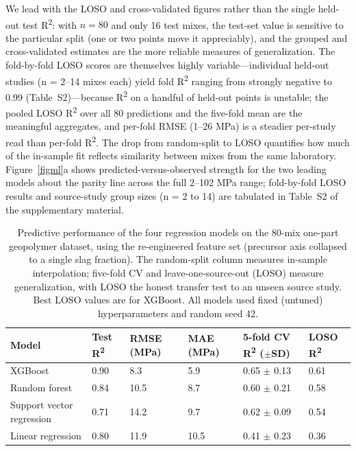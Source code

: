 \documentclass[materials,article,submit,pdftex,moreauthors]{Definitions/mdpi}
\begin{document}
We lead with the LOSO and cross-validated figures rather than the single held-out test R\textsuperscript{2}: with $n = 80$ and only 16 test mixes, the test-set value is sensitive to the particular split (one or two points move it appreciably), and the grouped and cross-validated estimates are the more reliable measures of generalization. The fold-by-fold LOSO scores are themselves highly variable---individual held-out studies (n = 2--14 mixes each) yield fold R\textsuperscript{2} ranging from strongly negative to 0.99 (Table~S2)---because R\textsuperscript{2} on a handful of held-out points is unstable; the pooled LOSO R\textsuperscript{2} over all 80 predictions and the five-fold mean are the meaningful aggregates, and per-fold RMSE (1--26 MPa) is a steadier per-study read than per-fold R\textsuperscript{2}. The drop from random-split to LOSO quantifies how much of the in-sample fit reflects similarity between mixes from the same laboratory. Figure~\ref{figml}a shows predicted-versus-observed strength for the two leading models about the parity line across the full 2--102 MPa range; fold-by-fold LOSO results and source-study group sizes (n = 2 to 14) are tabulated in Table~S2 of the supplementary material.


\begin{table}[H]
\caption{Predictive performance of the four regression models on the 80-mix one-part geopolymer dataset, using the re-engineered feature set (precursor axis collapsed to a single slag fraction). The random-split column measures in-sample interpolation; five-fold CV and leave-one-source-out (LOSO) measure generalization, with LOSO the honest transfer test to an unseen source study. Best LOSO values are for XGBoost. All models used fixed (untuned) hyperparameters and random seed 42.\label{tab1}}
\begin{tabularx}{\textwidth}{lCCCCC}
\toprule
\textbf{Model} & \textbf{Test R\textsuperscript{2}} & \textbf{RMSE (MPa)} & \textbf{MAE (MPa)} & \textbf{5-fold CV R\textsuperscript{2} ($\pm$SD)} & \textbf{LOSO R\textsuperscript{2}}\\
\midrule
XGBoost & 0.90 & 8.3 & 5.9 & 0.65 $\pm$ 0.13 & 0.61\\
Random forest & 0.84 & 10.5 & 8.7 & 0.60 $\pm$ 0.21 & 0.58\\
Support vector regression & 0.71 & 14.2 & 9.7 & 0.62 $\pm$ 0.09 & 0.54\\
Linear regression & 0.80 & 11.9 & 10.5 & 0.41 $\pm$ 0.23 & 0.36\\
\bottomrule
\end{tabularx}
\end{table}
\end{document}
